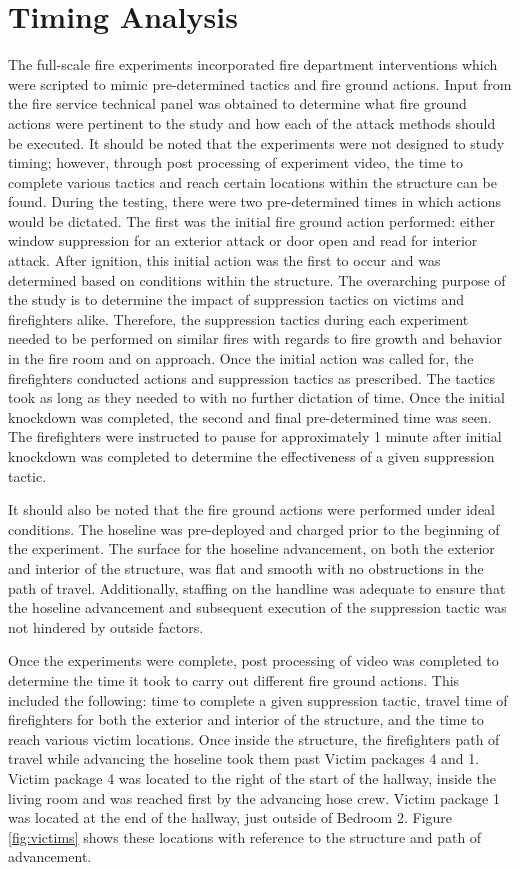 \documentclass[12pt,oneside]{book}
\begin{document}
\section{Timing Analysis}
The full-scale fire experiments incorporated fire department interventions which were scripted to mimic pre-determined tactics and fire ground actions. Input from the fire service technical panel was obtained to determine what fire ground actions were pertinent to the study and how each of the attack methods should be executed. It should be noted that the experiments were not designed to study timing; however, through post processing of experiment video, the time to complete various tactics and reach certain locations within the structure can be found. During the testing, there were two pre-determined times in which actions would be dictated. The first was the initial fire ground action performed: either window suppression for an exterior attack or door open and read for interior attack. After ignition, this initial action was the first to occur and was determined based on conditions within the structure. The overarching purpose of the study is to determine the impact of suppression tactics on victims and firefighters alike. Therefore, the suppression tactics during each experiment needed to be performed on similar fires with regards to fire growth and behavior in the fire room and on approach. Once the initial action was called for, the firefighters conducted actions and suppression tactics as prescribed. The tactics took as long as they needed to with no further dictation of time. Once the initial knockdown was completed, the second and final pre-determined time was seen. The firefighters were instructed to pause for approximately 1 minute after initial knockdown was completed to determine the effectiveness of a given suppression tactic.

It should also be noted that the fire ground actions were performed under ideal conditions. The hoseline was pre-deployed and charged prior to the beginning of the experiment. The surface for the hoseline advancement, on both the exterior and interior of the structure, was flat and smooth with no obstructions in the path of travel. Additionally, staffing on the handline was adequate to ensure that the hoseline advancement and subsequent execution of the suppression tactic was not hindered by outside factors. 

Once the experiments were complete, post processing of video was completed to determine the time it took to carry out different fire ground actions. This included the following: time to complete a given suppression tactic, travel time of firefighters for both the exterior and interior of the structure, and the time to reach various victim locations. Once inside the structure, the firefighters path of travel while advancing the hoseline took them past Victim packages 4 and 1. Victim package 4 was located to the right of the start of the hallway, inside the living room and was reached first by the advancing hose crew. Victim package 1 was located at the end of the hallway, just outside of Bedroom 2. Figure \ref{fig:victims} shows these locations with reference to the structure and path of advancement.
\end{document}
